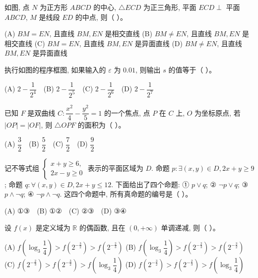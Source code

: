 \begin{question}
如图, 点 $N$ 为正方形 $ABCD$ 的中心, $\triangle ECD$ 为正三角形, 平面 $ECD \perp$ 平面 $ABCD$, $M$ 是线段 $ED$ 的中点, 则（ ）。
\nopagebreak[4]
\begin{center}\end{center}
\nopagebreak[4]
(A) $BM = EN$, 且直线 $BM, EN$ 是相交直线  
(B) $BM \neq EN$, 且直线 $BM, EN$ 是相交直线  
(C) $BM = EN$, 且直线 $BM, EN$ 是异面直线  
(D) $BM \neq EN$, 且直线 $BM, EN$ 是异面直线

\Needspace{0.4\textheight}
\end{question}
\begin{question}
执行如图的程序框图, 如果输入的 $\varepsilon$ 为 $0.01$, 则输出 $s$ 的值等于（ ）。
\nopagebreak[4]
\begin{center}\end{center}
\nopagebreak[4]
(A) $2 - \dfrac{1}{2^4}$　(B) $2 - \dfrac{1}{2^5}$　(C) $2 - \dfrac{1}{2^6}$　(D) $2 - \dfrac{1}{2^7}$

\end{question}
\begin{question}
已知 $F$ 是双曲线 $C: \dfrac{x^2}{4} - \dfrac{y^2}{5} = 1$ 的一个焦点, 点 $P$ 在 $C$ 上, $O$ 为坐标原点, 若 $|OP| = |OF|$, 则 $\triangle OPF$ 的面积为（ ）。

(A) $\dfrac{3}{2}$　(B) $\dfrac{5}{2}$　(C) $\dfrac{7}{2}$　(D) $\dfrac{9}{2}$

\end{question}
\begin{question}
记不等式组
$\begin{cases} x + y \geqslant 6, \\ 2x - y \geqslant 0 \end{cases}$
表示的平面区域为 $D$. 命题 $p: \exists (x, y) \in D, 2x + y \geqslant 9$; 命题 $q: \forall (x, y) \in D, 2x + y \leqslant 12$. 下面给出了四个命题:  
① $p \lor q$; ② $\neg p \lor q$; ③ $p \land \neg q$; ④ $\neg p \land \neg q$.  
这四个命题中, 所有真命题的编号是（ ）。

(A) ①③　(B) ①②　(C) ②③　(D) ③④

\end{question}
\begin{question}
设 $f(x)$ 是定义域为 $\mathbb{R}$ 的偶函数, 且在 $(0, +\infty)$ 单调递减, 则（ ）。

(A) $f\left(\log_3 \dfrac{1}{4}\right) > f\left(2^{-\frac{3}{2}}\right) > f\left(2^{-\frac{2}{3}}\right)$  
(B) $f\left(\log_3 \dfrac{1}{4}\right) > f\left(2^{-\frac{2}{3}}\right) > f\left(2^{-\frac{3}{2}}\right)$  
(C) $f\left(2^{-\frac{2}{3}}\right) > f\left(2^{-\frac{3}{2}}\right) > f\left(\log_3 \dfrac{1}{4}\right)$  
(D) $f\left(2^{-\frac{3}{2}}\right) > f\left(2^{-\frac{2}{3}}\right) > f\left(\log_3 \dfrac{1}{4}\right)$

\par\medskip

\end{question}

